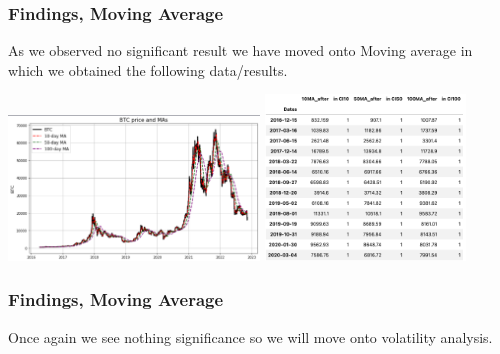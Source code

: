 \documentclass{beamer}
\begin{document}
\begin{frame}
    \frametitle{Findings, Moving Average}
As we observed no significant result we have moved onto Moving average in which we obtained the following data/results.
\begin{center}
  \includegraphics[width=0.5\textwidth]{research_project/text/paper/2.png}
\includegraphics[width=0.4\textwidth]{research_project/text/paper/ma_ci.png}  
\end{center}
\end{frame}

\begin{frame}
    \frametitle{Findings, Moving Average}
Once again we see nothing significance so we will move onto volatility analysis.
\end{frame}
\end{document}
